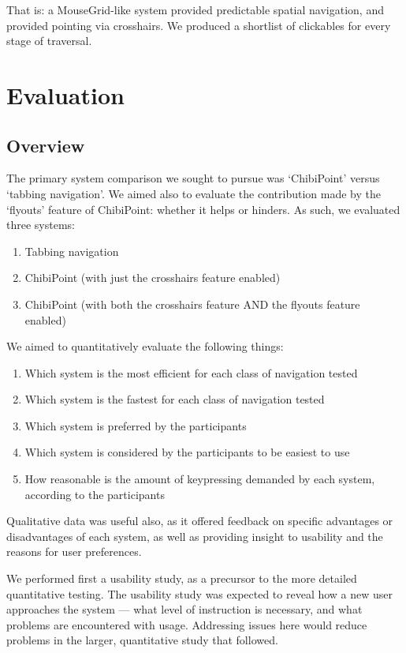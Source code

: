 \documentclass[11pt,openright,a4paper]{report}
\begin{document}
That is: a MouseGrid-like system provided predictable spatial navigation, and provided pointing via crosshairs. We produced a shortlist of clickables for every stage of traversal.

\chapter{Evaluation}
\label{chap:evaluation}
\section{Overview}
The primary system comparison we sought to pursue was `ChibiPoint' versus `tabbing navigation'. We aimed also to evaluate the contribution made by the `flyouts' feature of ChibiPoint: whether it helps or hinders. As such, we evaluated three systems:
\begin{enumerate}
\item Tabbing navigation
\item ChibiPoint (with just the crosshairs feature enabled)
\item ChibiPoint (with both the crosshairs feature AND the flyouts feature enabled)
\end{enumerate}

We aimed to quantitatively evaluate the following things:
\begin{enumerate}
\item Which system is the most efficient for each class of navigation tested
\item Which system is the fastest for each class of navigation tested
\item Which system is preferred by the participants
\item Which system is considered by the participants to be easiest to use
\item How reasonable is the amount of keypressing demanded by each system, according to the participants
\end{enumerate}

Qualitative data was useful also, as it offered feedback on specific advantages or disadvantages of each system, as well as providing insight to usability and the reasons for user preferences.

We performed first a usability study, as a precursor to the more detailed quantitative testing. The usability study was expected to reveal how a new user approaches the system --- what level of instruction is necessary, and what problems are encountered with usage. Addressing issues here would reduce problems in the larger, quantitative study that followed.
\end{document}
